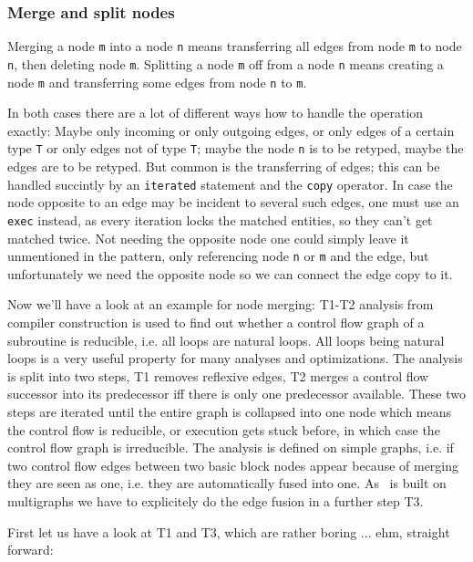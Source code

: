 \subsubsection*{Merge and split nodes}
Merging a node \texttt{m} into a node \texttt{n} means transferring all edges from node \texttt{m} to node \texttt{n}, then deleting node \texttt{m}. 
Splitting a node \texttt{m} off from a node \texttt{n} means creating a node \texttt{m} and transferring some edges from node \texttt{n} to \texttt{m}.

In both cases there are a lot of different ways how to handle the operation exactly:
Maybe only incoming or only outgoing edges, or only edges of a certain type \texttt{T} or only edges not of type \texttt{T}; maybe the node \texttt{n} is to be retyped, maybe the edges are to be retyped. 
But common is the transferring of edges; this can be handled succintly by an \texttt{iterated} statement and the \texttt{copy} operator.
In case the node opposite to an edge may be incident to several such edges, one must use an \texttt{exec} instead, as every iteration locks the matched entities, so they can't get matched twice. Not needing the opposite node one could simply leave it unmentioned in the pattern, only referencing node \texttt{n} or \texttt{m} and the edge, but unfortunately we need the opposite node so we can connect the edge copy to it.

Now we'll have a look at an example for node merging: T1-T2 analysis from compiler construction is used to find out whether a control flow graph of a subroutine is reducible, i.e. all loops are natural loops. All loops being natural loops is a very useful property for many analyses and optimizations. The analysis is split into two steps, T1 removes reflexive edges, T2 merges a control flow successor into its predecessor iff there is only one predecessor available. These two steps are iterated until the entire graph is collapsed into one node which means the control flow is reducible, or execution gets stuck before, in which case the control flow graph is irreducible.
The analysis is defined on simple graphs, i.e. if two control flow edges between two basic block nodes appear because of merging they are seen as one, i.e. they are automatically fused into one. As \GrG~is built on multigraphs we have to explicitely do the edge fusion in a further step T3.

First let us have a look at T1 and T3, which are rather boring ... ehm, straight forward:

